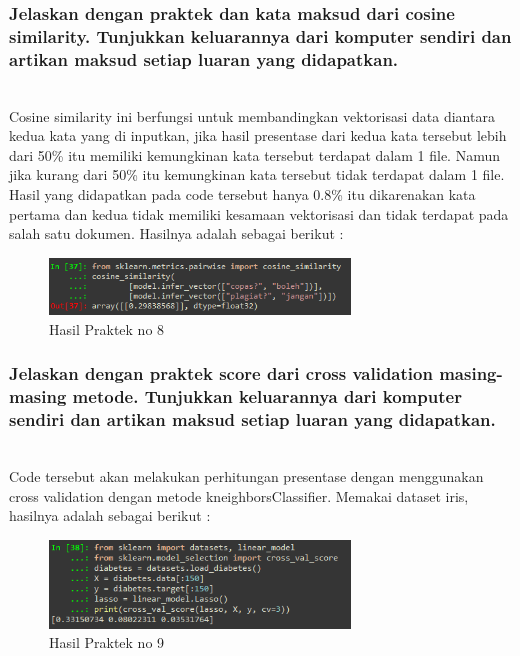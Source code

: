 \subsubsection{Jelaskan dengan praktek dan kata maksud dari cosine similarity. Tunjukkan keluarannya dari komputer sendiri dan artikan maksud setiap luaran yang didapatkan.}
\hfill\\

Cosine similarity ini berfungsi untuk membandingkan vektorisasi data diantara kedua kata yang di inputkan, jika hasil presentase dari kedua kata tersebut lebih dari 50\% itu memiliki kemungkinan kata tersebut terdapat dalam 1 file. Namun jika kurang dari 50\% itu kemungkinan kata tersebut tidak terdapat dalam 1 file. Hasil yang didapatkan pada code tersebut hanya 0.8\% itu dikarenakan kata pertama dan kedua tidak memiliki kesamaan vektorisasi dan tidak terdapat pada salah satu dokumen. Hasilnya adalah sebagai berikut :
\begin{figure}[H]
	\centering
	\includegraphics[width=8cm]{figures/1174083/figures5/44.png}
	\caption{Hasil Praktek no 8}
\end{figure}

\subsubsection{Jelaskan dengan praktek score dari cross validation masing-masing metode. Tunjukkan keluarannya dari komputer sendiri dan artikan maksud setiap luaran yang didapatkan.}
\hfill\\

Code tersebut akan melakukan perhitungan presentase dengan menggunakan
cross validation dengan metode kneighborsClassifier. Memakai dataset iris,
hasilnya adalah sebagai berikut :
\begin{figure}[H]
	\centering
	\includegraphics[width=8cm]{figures/1174083/figures5/45.png}
	\caption{Hasil Praktek no 9}
\end{figure}

